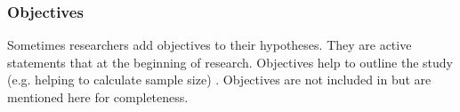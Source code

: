 
\subsubsection{Objectives}

Sometimes researchers add objectives to their hypotheses. They are active statements that  \cite[p. 280]{Farrugia2009} at the beginning of research. Objectives help to outline the study (e.g. helping to calculate sample size) \cite{Farrugia2009,Vickers}. Objectives are not included in \briefingform{} but are mentioned here for completeness.